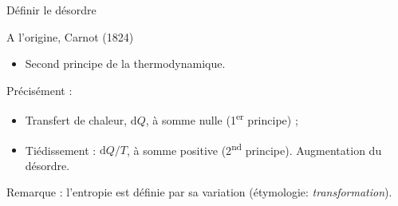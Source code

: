 \documentclass[ignorenonframetext,]{beamer}
\providecommand{\tightlist}{%
  \setlength{\itemsep}{0pt}\setlength{\parskip}{0pt}}
\begin{document}
\begin{frame}{Définir le désordre}

A l'origine, Carnot (1824)

\begin{itemize}
\tightlist
\item
  Second principe de la thermodynamique.
\end{itemize}

Précisément :

\begin{itemize}
\item
  Transfert de chaleur, \(\mathrm{d}Q\), à somme nulle
  (1\textsuperscript{er} principe) ;
\item
  Tiédissement : \(\mathrm{d}Q/T\), à somme positive
  (2\textsuperscript{nd} principe). Augmentation du désordre.
\end{itemize}

Remarque : l'entropie est définie par sa variation (étymologie:
\emph{transformation}).

\end{frame}
\end{document}
